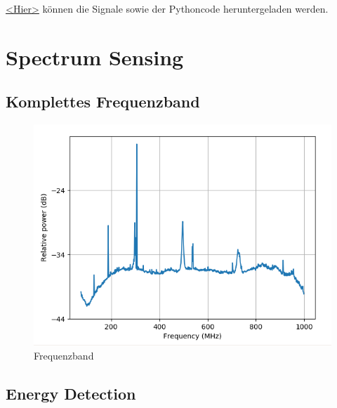 \documentclass[12pt,a4paper]{article}
\begin{document}
\href{https://mega.nz/file/WlpFUDCI#UwWxYXxkRgZ9H_AYNt0trYvE5ey_xcw59lDZif9uqtI}
{<Hier>} können die Signale sowie der Pythoncode heruntergeladen werden.


\newpage
\section{Spectrum Sensing}

\subsection*{Komplettes Frequenzband}

\begin{figure}[hbt!]
	\centering
		\includegraphics[width=1\textwidth ]
		{Bilder/A3_full_frequency_band.png}
		\caption{Frequenzband}
\end{figure}



\subsection*{Energy Detection}
\end{document}
